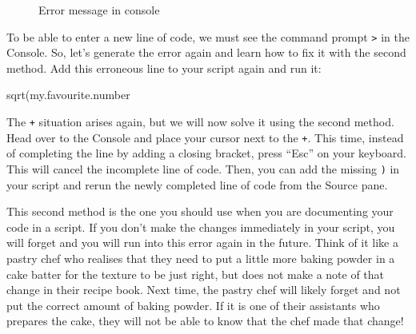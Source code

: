 \documentclass[
  letterpaper,
  DIV=11,
  numbers=noendperiod,
  oneside]{scrreprt}
\newenvironment{Shaded}{\begin{snugshade}}{\end{snugshade}}
\newcommand{\FunctionTok}[1]{\textcolor[rgb]{0.28,0.35,0.67}{#1}}
\newcommand{\NormalTok}[1]{\textcolor[rgb]{0.00,0.23,0.31}{#1}}
\begin{document}
\begin{figure}


\caption{\label{fig-ConsoleError}Error message in console}

\end{figure}%

To be able to enter a new line of code, we must see the command prompt
\texttt{\textgreater{}} in the Console. So, let's generate the error
again and learn how to fix it with the second method. Add this erroneous
line to your script again and run it:

\begin{Shaded}
\begin{Highlighting}[]
\FunctionTok{sqrt}\NormalTok{(my.favourite.number}
\end{Highlighting}
\end{Shaded}

The \texttt{+} situation arises again, but we will now solve it using
the second method. Head over to the Console and place your cursor next
to the \texttt{+}. This time, instead of completing the line by adding a
closing bracket, press ``Esc'' on your keyboard. This will cancel the
incomplete line of code. Then, you can add the missing \texttt{)} in
your script and rerun the newly completed line of code from the Source
pane.

This second method is the one you should use when you are documenting
your code in a script. If you don't make the changes immediately in your
script, you will forget and you will run into this error again in the
future. Think of it like a pastry chef who realises that they need to
put a little more baking powder in a cake batter for the texture to be
just right, but does not make a note of that change in their recipe
book. Next time, the pastry chef will likely forget and not put the
correct amount of baking powder. If it is one of their assistants who
prepares the cake, they will not be able to know that the chef made that
change!
\end{document}

